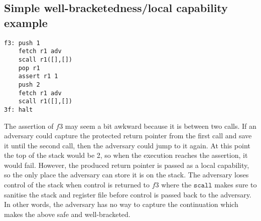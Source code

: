\documentclass[a4paper]{article}
\begin{document}
\subsection{Simple well-bracketedness/local capability example}
\begin{comment}
\begin{verbatim}
let f = fun adv =>
          let x = 1 in
          adv();
          assert(!x == 1);
          x := 2;
          adv();
          return
\end{verbatim}
              A sensible calling scheme uses local capabilities for the continuation capability passed to the callee. In the above example, if \texttt{adv} can store the continuation, then 
              \texttt{adv} can invoke it during the second call and thus force the assertion to fail. We expect this program to either not terminate or terminate in a failed state (not caused by the assertion) or terminate with the result 0.
            \end{comment}

\begin{verbatim}
f3: push 1
    fetch r1 adv
    scall r1([],[])
    pop r1
    assert r1 1
    push 2
    fetch r1 adv
    scall r1([],[])
3f: halt
\end{verbatim}
The assertion of $f3$ may seem a bit awkward because it is between two calls. If an adversary could capture the protected return pointer from the first call and save it until the second call, then the adversary could jump to it again. At this point the top of the stack would be 2, so when the execution reaches the assertion, it would fail. However, the produced return pointer is passed as a local capability, so the only place the adversary can store it is on the stack. The adversary loses control of the stack when control is returned to $f3$ where the $\mathtt{scall}$ makes sure to sanitise the stack and register file before control is passed back to the adversary. In other words, the adversary has no way to capture the continuation which makes the above safe and well-bracketed.
\end{document}
